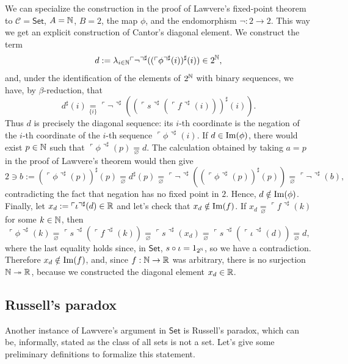 \begin{remark}
    We can specialize the construction in the proof of Lawvere's fixed-point theorem to $\mathcal C=\mathsf{Set}$, $A=\mathbb{N}$, $B=2$, the map $\phi$, and the endomorphism $\neg : 2 \to 2$.
    This way we get an explicit construction of Cantor's diagonal element. We construct the term
    \[ d := \lambda_{i \in \mathbb{N}}\ulcorner \neg \urcorner^\sharp((\ulcorner \phi \urcorner^\sharp(i))^\sharp(i)) \in 2^{\mathbb{N}}, \]
    and, under the identification of the elements of $2^{\mathbb{N}}$ with binary sequences, we have, by $\beta$-reduction, that
    \[ d^\sharp(i) \underset{\{i\}}{=} \ulcorner \neg \urcorner^\sharp((\ulcorner s \urcorner^\sharp(\ulcorner f \urcorner^\sharp(i)))^\sharp(i)). \]
    Thus $d$ is precisely the diagonal sequence: its $i$-th coordinate is the negation of the $i$-th coordinate of the $i$-th sequence $\ulcorner \phi \urcorner^\sharp(i)$.\newline
    If $d \in \operatorname{Im}(\phi)$, there would exist $p \in \mathbb{N}$ such that $\ulcorner \phi \urcorner^\sharp(p) \underset{\varnothing}{=}d$.
    The calculation obtained by taking $a=p$ in the proof of Lawvere's theorem would then give
    \[ 2 \ni b := (\ulcorner \phi \urcorner^\sharp(p))^\sharp(p) \underset{\varnothing}{=} d^\sharp(p) \underset{\varnothing}{=} \ulcorner \neg \urcorner^\sharp((\ulcorner \phi \urcorner^\sharp(p))^\sharp(p)) \underset{\varnothing}{=} \ulcorner \neg \urcorner^\sharp(b), \]
    contradicting the fact that negation has no fixed point in $2$. Hence, $d \notin \operatorname{Im}(\phi)$.
    Finally, let $x_d:=\ulcorner \iota \urcorner^\sharp(d) \in \mathbb{R}$ and let's check that $x_d \notin \operatorname{Im}(f)$. If $x_d \underset{\varnothing}{=}\ulcorner f \urcorner^\sharp(k)$ for some $k \in \mathbb{N}$, then
    \[ \ulcorner \phi \urcorner^\sharp(k) \underset{\varnothing}{=}\ulcorner s \urcorner^\sharp(\ulcorner f \urcorner^\sharp(k)) \underset{\varnothing}{=}\ulcorner s \urcorner^\sharp(x_d) \underset{\varnothing}{=}\ulcorner s \urcorner^\sharp(\ulcorner \iota \urcorner^\sharp(d)) \underset{\varnothing}{=}d, \]
    where the last equality holds since, in $\mathsf{Set}$, $s \circ \iota = 1_{2^{\mathbb{N}}}$, so we have a contradiction.
    Therefore $x_d \notin \operatorname{Im}(f)$, and, since $f : \mathbb{N} \to \mathbb{R}$ was arbitrary, there is no surjection $\mathbb{N} \twoheadrightarrow \mathbb{R}$, because we constructed the diagonal element $x_d \in \mathbb{R}$.
\end{remark}

\subsection*{Russell's paradox}
Another instance of Lawvere's argument in $\mathsf{Set}$ is Russell's paradox, which can be, informally, stated as the class of all sets is not a set.
Let's give some preliminary definitions to formalize this statement.

